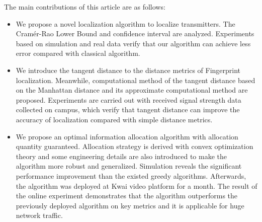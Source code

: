 \begin{eabstract}
   The main contributions of this article are as follows:
   \begin{itemize}
   	\item We propose a novel localization algorithm to localize transmitters. The Cram\'{e}r-Rao Lower Bound and confidence interval are analyzed. Experiments based on simulation and real data verify that our algorithm can achieve less error compared with classical algorithm.
   	\item We introduce the tangent distance to the distance metrics of Fingerprint localization. Meanwhile, computational method of the tangent distance based on the Manhattan distance and its approximate computational method are proposed. Experiments are carried out with received signal strength data collected on campus, which verify that tangent distance can improve the accuracy of localization compared with simple distance metrics.
   	\item We propose an optimal information allocation algorithm with allocation quantity guaranteed. Allocation strategy is derived with convex optimization theory and some engineering details are also introduced to make the algorithm more robust and generalized. Simulation reveals the significant performance improvement than the existed greedy algorithms. Afterwards, the algorithm was deployed at Kwai video platform for a month. The result of the online experiment demonstrates that the algorithm outperforms the previously deployed algorithm on key metrics and it is applicable for huge network traffic. 
   \end{itemize}
   
\end{eabstract}

